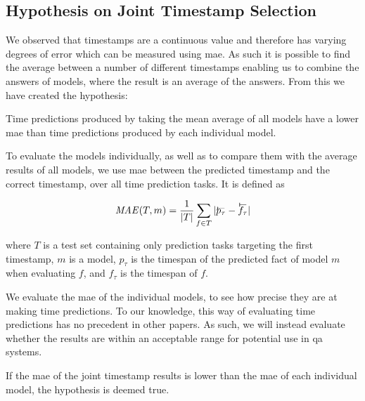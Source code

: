 \subsection{Hypothesis on Joint Timestamp Selection}
\label{sec:hypothesis_timestamp_voting}

We observed that timestamps are a continuous value and therefore has varying degrees of error which can be measured using \gls{mae}. 
As such it is possible to find the average between a number of different timestamps enabling us to combine the answers of models, where the result is an average of the answers.
From this we have created the hypothesis:

\begin{hypothesis}
\label{hyp:timestamp_voting}
Time predictions produced by taking the mean average of all models have a lower \gls{mae} than time predictions produced by each individual model.
\end{hypothesis}

To evaluate the models individually, as well as to compare them with the average results of all models, we use \gls{mae} between the predicted timestamp and the correct timestamp, over all time prediction tasks. It is defined as

\begin{equation}
\mathit{MAE}(T, m) = \frac{1}{|T|} \varsum_{f \in T} | \timebegin{p_\tau} - \timebegin{f_\tau} |
\end{equation}

\noindent
where $T$ is a test set containing only prediction tasks targeting the first timestamp, $m$ is a model, $p_\tau$ is the timespan of the predicted fact of model $m$ when evaluating $f$, and $f_\tau$ is the timespan of $f$.

We evaluate the \gls{mae} of the individual models, to see how precise they are at making time predictions. To our knowledge, this way of evaluating time predictions has no precedent in other papers. As such, we will instead evaluate whether the results are within an acceptable range for potential use in \gls{qa} systems.

If the \gls{mae} of the joint timestamp results is lower than the \gls{mae} of each individual model, the hypothesis is deemed true.